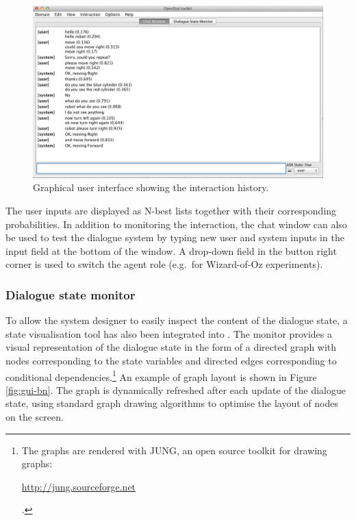 \begin{figure}[h]
\centering
\includegraphics[scale=0.40]{imgs/gui-chatbox.png}
\caption{Graphical user interface showing the interaction history.}
\label{fig:gui-chatbox}
\end{figure}

  The user inputs are displayed as N-best lists together with their corresponding probabilities. In addition to monitoring the interaction, the chat window can also be used to test the dialogue system by typing new user and system inputs in the input field at the bottom of the window.  A drop-down field in the button right corner is used to switch the agent role (e.g.\ for Wizard-of-Oz experiments). 


\subsubsection*{Dialogue state monitor}

To allow the system designer to easily inspect the content of the dialogue state, a state visualisation tool has also been integrated into \opendial{}.  The monitor provides a visual representation of the dialogue state in the form of a directed graph with nodes corresponding to the state variables and directed edges corresponding to conditional dependencies.\footnote{The graphs are rendered with JUNG, an open source toolkit for drawing graphs: \begin{scriptsize}\url{http://jung.sourceforge.net}\end{scriptsize}.} An example of graph layout is shown in Figure \ref{fig:gui-bn}. The graph is dynamically refreshed after each update of the dialogue state, using standard graph drawing algorithms to optimise the layout of nodes on the screen. 

